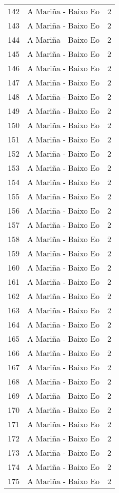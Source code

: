 \begin{table}[p]
\begin{tabular}{rlr}
  142 & A Mariña - Baixo Eo &   2 \\ 
  143 & A Mariña - Baixo Eo &   2 \\ 
  144 & A Mariña - Baixo Eo &   2 \\ 
  145 & A Mariña - Baixo Eo &   2 \\ 
  146 & A Mariña - Baixo Eo &   2 \\ 
  147 & A Mariña - Baixo Eo &   2 \\ 
  148 & A Mariña - Baixo Eo &   2 \\ 
  149 & A Mariña - Baixo Eo &   2 \\ 
  150 & A Mariña - Baixo Eo &   2 \\ 
  151 & A Mariña - Baixo Eo &   2 \\ 
  152 & A Mariña - Baixo Eo &   2 \\ 
  153 & A Mariña - Baixo Eo &   2 \\ 
  154 & A Mariña - Baixo Eo &   2 \\ 
  155 & A Mariña - Baixo Eo &   2 \\ 
  156 & A Mariña - Baixo Eo &   2 \\ 
  157 & A Mariña - Baixo Eo &   2 \\ 
  158 & A Mariña - Baixo Eo &   2 \\ 
  159 & A Mariña - Baixo Eo &   2 \\ 
  160 & A Mariña - Baixo Eo &   2 \\ 
  161 & A Mariña - Baixo Eo &   2 \\ 
  162 & A Mariña - Baixo Eo &   2 \\ 
  163 & A Mariña - Baixo Eo &   2 \\ 
  164 & A Mariña - Baixo Eo &   2 \\ 
  165 & A Mariña - Baixo Eo &   2 \\ 
  166 & A Mariña - Baixo Eo &   2 \\ 
  167 & A Mariña - Baixo Eo &   2 \\ 
  168 & A Mariña - Baixo Eo &   2 \\ 
  169 & A Mariña - Baixo Eo &   2 \\ 
  170 & A Mariña - Baixo Eo &   2 \\ 
  171 & A Mariña - Baixo Eo &   2 \\ 
  172 & A Mariña - Baixo Eo &   2 \\ 
  173 & A Mariña - Baixo Eo &   2 \\ 
  174 & A Mariña - Baixo Eo &   2 \\ 
  175 & A Mariña - Baixo Eo &   2 \\ 

\end{tabular}
\end{table}
